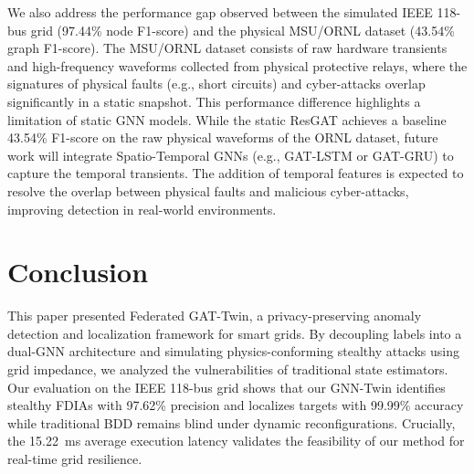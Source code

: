 \documentclass[10pt, a4paper, twocolumn]{article}
\begin{document}
We also address the performance gap observed between the simulated IEEE 118-bus grid (97.44\% node F1-score) and the physical MSU/ORNL dataset (43.54\% graph F1-score). The MSU/ORNL dataset consists of raw hardware transients and high-frequency waveforms collected from physical protective relays, where the signatures of physical faults (e.g., short circuits) and cyber-attacks overlap significantly in a static snapshot. This performance difference highlights a limitation of static GNN models. While the static ResGAT achieves a baseline 43.54\% F1-score on the raw physical waveforms of the ORNL dataset, future work will integrate Spatio-Temporal GNNs (e.g., GAT-LSTM or GAT-GRU) to capture the temporal transients. The addition of temporal features is expected to resolve the overlap between physical faults and malicious cyber-attacks, improving detection in real-world environments.

\section{Conclusion}
This paper presented Federated GAT-Twin, a privacy-preserving anomaly detection and localization framework for smart grids. By decoupling labels into a dual-GNN architecture and simulating physics-conforming stealthy attacks using grid impedance, we analyzed the vulnerabilities of traditional state estimators. Our evaluation on the IEEE 118-bus grid shows that our GNN-Twin identifies stealthy FDIAs with 97.62\% precision and localizes targets with 99.99\% accuracy while traditional BDD remains blind under dynamic reconfigurations. Crucially, the 15.22~ms average execution latency validates the feasibility of our method for real-time grid resilience.
\end{document}
